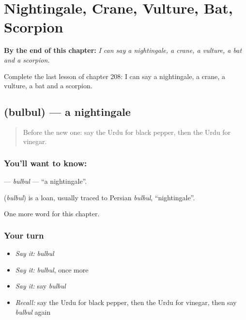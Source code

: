 
\chapter{Nightingale, Crane, Vulture, Bat, Scorpion}
\label{ch:ur-nightingale-crane-vulture-bat-scorpion}

\begin{chapteropening}
\textbf{By the end of this chapter:} \emph{I can say a nightingale, a crane, a vulture, a bat and a scorpion.}

Complete the last lesson of chapter 208: I can say a nightingale, a crane, a vulture, a bat and a scorpion.
\end{chapteropening}

\section[\texorpdfstring{\ur{بلبل} (bulbul)}{بلبل (bulbul)}]{ (bulbul) — a nightingale}

\label{lesson:UR-C208-bulbul}



\begin{quote}
Before the new one: say the Urdu for black pepper, then the Urdu for vinegar.
\end{quote}

\subsection*{You'll want to know: }
\textbf{} — \emph{bulbul} — \textquotedblleft{}a nightingale\textquotedblright{}.

\begin{cousinweb}
\textbf{} (\emph{bulbul}) is a loan, usually traced to Persian \emph{bulbul}, \textquotedblleft{}nightingale\textquotedblright{}.
\end{cousinweb}

\begin{grammarlens}[title={What you've built}]
One more word for this chapter.
\end{grammarlens}

\subsection*{Your turn}
\begin{itemize}
\raggedright
  \item \emph{Say it:} \emph{bulbul}
  \item \emph{Say it:} \emph{bulbul}, once more
  \item \emph{Say it:} say \emph{bulbul}
  \item \emph{Recall:} say the Urdu for black pepper, then the Urdu for vinegar, then say \emph{bulbul} again
\end{itemize}

